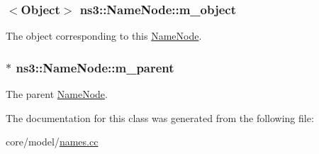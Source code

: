 \subsubsection[{\texorpdfstring{m\+\_\+object}{m_object}}]{$<${\bf Object}$>$ ns3\+::\+Name\+Node\+::m\+\_\+object}\hypertarget{classns3_1_1NameNode_ab5417732c84a06149e0820d35bc85a7c}{}\label{classns3_1_1NameNode_ab5417732c84a06149e0820d35bc85a7c}
The object corresponding to this \hyperlink{classns3_1_1NameNode}{Name\+Node}. 
\subsubsection[{\texorpdfstring{m\+\_\+parent}{m_parent}}]{$\ast$ ns3\+::\+Name\+Node\+::m\+\_\+parent}\hypertarget{classns3_1_1NameNode_a2c5fdd9118e10047488a9967428d9474}{}\label{classns3_1_1NameNode_a2c5fdd9118e10047488a9967428d9474}
The parent \hyperlink{classns3_1_1NameNode}{Name\+Node}. 

The documentation for this class was generated from the following file\+:\begin{DoxyCompactItemize}
\item 
core/model/\hyperlink{names_8cc}{names.\+cc}\end{DoxyCompactItemize}
